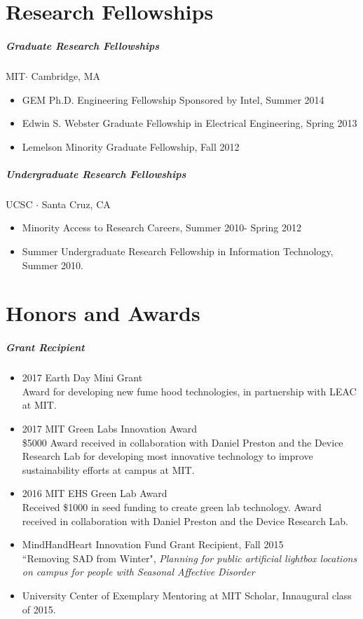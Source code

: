 \documentclass[10pt,letterpaper]{article}
\begin{document}



\section*{Research Fellowships}
\subparagraph{Graduate Research Fellowships}
MIT$\cdot$ Cambridge, MA 
\begin{itemize}
\item GEM Ph.D. Engineering Fellowship Sponsored by Intel, Summer 2014
\item  Edwin S. Webster Graduate Fellowship in Electrical Engineering, Spring 2013
\item Lemelson Minority Graduate Fellowship, Fall 2012
\end{itemize}
\subparagraph{Undergraduate Research Fellowships}
UCSC $\cdot$ Santa Cruz, CA
\begin{itemize}
\item Minority Access to Research Careers, Summer 2010- Spring 2012
\item  Summer Undergraduate Research Fellowship in Information Technology, Summer 2010.  
\end{itemize}


\section*{Honors and Awards}
\subparagraph{Grant Recipient}
\begin{itemize}
\item 2017 Earth Day Mini Grant \\
Award for developing new fume hood technologies, in partnership with LEAC at MIT.
\item 2017 MIT Green Labs Innovation Award\\
\$5000 Award received in collaboration with Daniel Preston and the Device Research Lab for developing most innovative technology to improve sustainability efforts at campus at MIT. 
\item 2016 MIT EHS Green Lab Award \\
    Received \$1000 in seed funding to create green lab technology. Award received in collaboration with Daniel Preston and the Device Research Lab. 
\item MindHandHeart Innovation Fund Grant Recipient, Fall 2015\\
``Removing SAD from Winter", {\em Planning for public artificial lightbox locations on campus for people with Seasonal Affective Disorder }
\item University Center of Exemplary Mentoring at MIT Scholar, Innaugural class of 2015.
\end{itemize}
\end{document}
